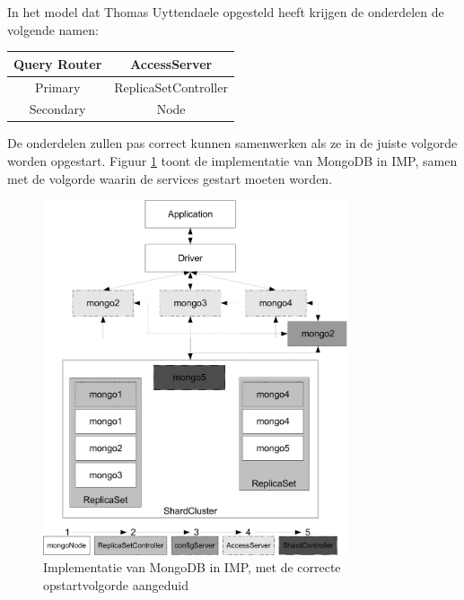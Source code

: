 In het model dat Thomas Uyttendaele opgesteld heeft  krijgen de onderdelen de volgende namen:

\begin{table}[h!]
  \begin{center}
  \begin{tabular}{c | c}
  Query Router  & AccessServer \\ \hline
  Primary       & ReplicaSetController \\ \hline
  Secondary     & Node \\ 
  \end{tabular}
  \end{center}
\end{table}

De onderdelen zullen pas correct kunnen samenwerken als ze in de juiste volgorde worden opgestart.
Figuur \ref{fig:mongo_imp} toont de implementatie van MongoDB in IMP, samen met de volgorde waarin de services gestart moeten worden.

\begin{figure}[h]
    \begin{center}
    \includegraphics[width=0.8\textwidth]{images/mongo_imp.pdf}
    \caption{Implementatie van MongoDB in IMP, met de correcte opstartvolgorde aangeduid}
    \label{fig:mongo_imp}
    \end{center}
\end{figure}

